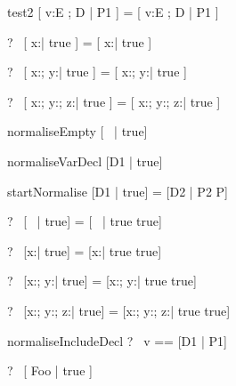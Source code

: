 \begin{zedrule}{test2}
  [ v:E ; D | P1 ] = [ v:E ; D | P1 ]
\end{zedrule}

\begin{zed}
  \vdash?~ [ x:\nat | true ] = [ x:\nat | true ]
\end{zed}

\begin{zed}
  \vdash?~ [ x:\nat; y:\nat | true ] = [ x:\nat; y:\nat | true ]
\end{zed}

\begin{zed}
  \vdash?~ [ x:\nat; y:\nat ; z:\nat | true ] =
           [ x:\nat; y:\nat ; z:\nat | true ]
\end{zed}



\begin{zedrule}{normaliseEmpty}
   [~ | true] \unfoldsTo [~ | true]
\end{zedrule}

\begin{zedrule}{normaliseVarDecl}
   [D1 | true] \unfoldsTo [D2 | P2]
\derives
   [v:E; D1 | true] \unfoldsTo [v:E; D2 | P2]
\end{zedrule}

\begin{zedrule}{startNormalise}
   [D1 | true] \unfoldsTo [D2 | P2]
\derives
   [D1 | P] = [D2 | P2 \land P]
\end{zedrule}

\begin{zed}
  \vdash?~ [~ | true] = [~ | true \land true]
\end{zed}

\begin{zed}
  \vdash?~ [x:\nat | true] = [x:\nat | true \land true]
\end{zed}

\begin{zed}
  \vdash?~ [x:\nat ; y:\nat | true] = [x:\nat ; y:\nat | true \land true]
\end{zed}

\begin{zed}
  \vdash?~ [x:\nat ; y:\nat ; z:\nat | true] =
           [x:\nat ; y:\nat ; z:\nat | true \land true]
\end{zed}



\begin{zedrule}{normaliseIncludeDecl}
   \proviso ?~ v == [D1 | P1] \\
\derives
   [v; D | true] \unfoldsTo [D1 | P1 \land P2]
\end{zedrule}

\begin{zed}
  \vdash?~ [ Foo | true ] 
\end{zed}

